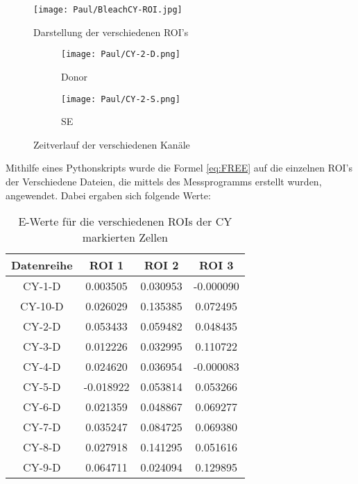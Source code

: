 \begin{figure}[h]
    \centering
    \texttt{[image: Paul/BleachCY-ROI.jpg]}
    \caption{Darstellung der verschiedenen ROI's}
    \label{fig:ROIs}
\end{figure}

\begin{figure}[h]
    \centering
    \begin{subfigure}{0.45\textwidth}
        \centering
        \texttt{[image: Paul/CY-2-D.png]}
        \caption{Donor}
    \end{subfigure}
    \hfill
    \begin{subfigure}{0.45\textwidth}
        \centering
        \texttt{[image: Paul/CY-2-S.png]}
        \caption{SE}
    \end{subfigure}
    \caption{Zeitverlauf der verschiedenen Kanäle}
    \label{fig:Zeitver}
\end{figure}

\newpage
Mithilfe eines Pythonskripts wurde die Formel \ref{eq:FREE} auf die einzelnen ROI's der Verschiedene Dateien, die mittels des Messprogramms erstellt wurden, angewendet. Dabei ergaben sich folgende Werte: 
\begin{table}[h]
    \centering
    \begin{tabular}{c|c|c|c}
          Datenreihe &     ROI 1 &     ROI 2 &     ROI 3 \\\hline\hline
          CY-1-D &  0.003505 &  0.030953 & -0.000090 \\\hline
          CY-10-D &  0.026029 &  0.135385 &  0.072495 \\\hline
           CY-2-D &  0.053433 &  0.059482 &  0.048435 \\\hline
           CY-3-D &  0.012226 &  0.032995 &  0.110722 \\\hline
           CY-4-D &  0.024620 &  0.036954 & -0.000083 \\\hline
           CY-5-D & -0.018922 &  0.053814 &  0.053266 \\\hline
           CY-6-D &  0.021359 &  0.048867 &  0.069277 \\\hline
           CY-7-D &  0.035247 &  0.084725 &  0.069380 \\\hline
           CY-8-D &  0.027918 &  0.141295 &  0.051616 \\\hline
           CY-9-D &  0.064711 &  0.024094 &  0.129895 \\\hline
        \end{tabular}
        \caption{E-Werte für die verschiedenen ROIs der CY markierten Zellen}
        \label{tb:ECY}
\end{table}

